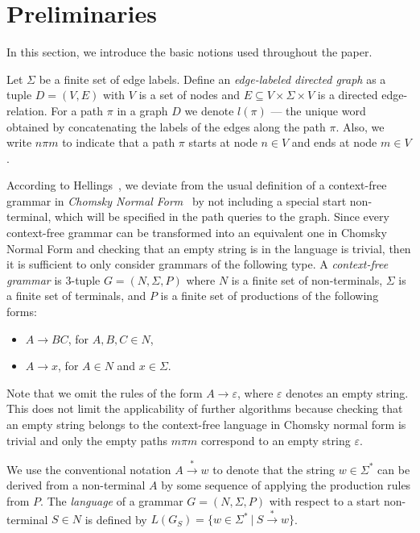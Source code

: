 \section{Preliminaries} \label{section_preliminaries}
In this section, we introduce the basic notions used throughout the paper.

Let $\Sigma$ be a finite set of edge labels. Define an \textit{edge-labeled directed graph} as a tuple $D = (V, E)$ with $V$ is a set of nodes and $E \subseteq V \times \Sigma \times V$ is a directed edge-relation.  For a path $\pi$ in a graph $D$ we denote $l(\pi)$ --- the unique word obtained by concatenating the labels of the edges along the path $\pi$. Also, we write $n \pi m$ to indicate that a path $\pi$ starts at node $n \in V$ and ends at node $m \in V$.

According to Hellings~\cite{hellingsRelational}, we deviate from the usual definition of a context-free grammar in \textit{Chomsky Normal Form}~\cite{chomsky} by not including a special start non-terminal, which will be specified in the path queries to the graph. Since every context-free grammar can be transformed into an equivalent one in Chomsky Normal Form and checking that an empty string is in the language is trivial, then it is sufficient to only consider grammars of the following type. A \textit{context-free grammar} is 3-tuple $G = (N, \Sigma, P)$ where $N$ is a finite set of non-terminals, $\Sigma$ is a finite set of terminals, and $P$ is a finite set of productions of the following forms:

\begin{itemize}
    \item $A \rightarrow B C$, for $A,B,C \in N$,
    \item $A \rightarrow x$, for $A \in N$ and $x \in \Sigma$.   
\end{itemize}

Note that we omit the rules of the form $A \rightarrow \varepsilon$, where $\varepsilon$ denotes an empty string. This does not limit the applicability of further algorithms because checking that an empty string belongs to the context-free language in Chomsky normal form is trivial and only the empty paths $m \pi m$ correspond to an empty string $\varepsilon$.

We use the conventional notation $A \xrightarrow{*} w$ to denote that the string $w \in \Sigma^*$ can be derived from a non-terminal $A$ by some sequence of applying the production rules from $P$. The \textit{language} of a grammar $G = (N,\Sigma,P)$ with respect to a start non-terminal $S \in N$ is defined by $L(G_S) = \{w \in \Sigma^*~|~S \xrightarrow{*} w\}$.

